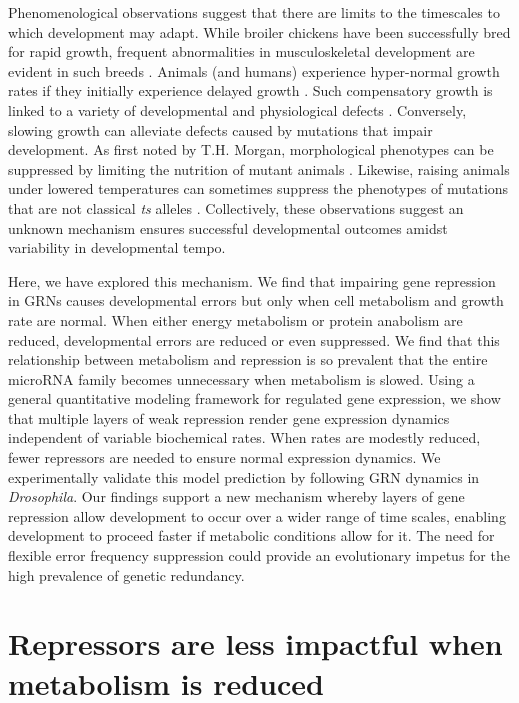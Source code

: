 Phenomenological observations suggest that there are limits to the timescales to which development may adapt. While broiler chickens have been successfully bred for rapid growth, frequent abnormalities in musculoskeletal development are evident in such breeds \cite{Julian2005,Whitehead2003}. Animals (and humans) experience hyper-normal growth rates if they initially experience delayed growth \cite{Arendt1997}. Such compensatory growth is linked to a variety of developmental and physiological defects \cite{Metcalfe2001}. Conversely, slowing growth can alleviate defects caused by mutations that impair development. As first noted by T.H. Morgan, morphological phenotypes can be suppressed by limiting the nutrition of mutant animals \cite{Child1939,Morgan1915,Morgan1929,Sang1963}. Likewise, raising animals under lowered temperatures can sometimes suppress the phenotypes of mutations that are not classical \textit{ts} alleles \cite{Child1935,Krafka1920,Lewis1980,Villee1943}. Collectively, these observations suggest an unknown mechanism ensures successful developmental outcomes amidst variability in developmental tempo.

Here, we have explored this mechanism. We find that impairing gene repression in GRNs causes developmental errors but only when cell metabolism and growth rate are normal. When either energy metabolism or protein anabolism are reduced, developmental errors are reduced or even suppressed. We find that this relationship between metabolism and repression is so prevalent that the entire microRNA family becomes unnecessary when metabolism is slowed. Using a general quantitative modeling framework for regulated gene expression, we show that multiple layers of weak repression render gene expression dynamics independent of variable biochemical rates. When rates are modestly reduced, fewer repressors are needed to ensure normal expression dynamics. We experimentally validate this model prediction by following GRN dynamics in \textit{Drosophila}. Our findings support a new mechanism whereby layers of gene repression allow development to occur over a wider range of time scales, enabling development to proceed faster if metabolic conditions allow for it. The need for flexible error frequency suppression could provide an evolutionary impetus for the high prevalence of genetic redundancy.

\section{Repressors are less impactful when metabolism is reduced}

